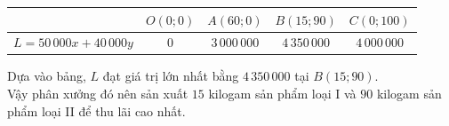 \begin{bt}
{{
}
\begin{center}
	\begin{tabular}{|c|c|c|c|c|}
		\hline
		& $O(0;0)$ & $A(60;0)$ & $B(15;90)$ & $C(0;100)$\\
		\hline
		$L=50\,000x+40\,000y$& $0$ & $3\,000\,000$ & $4\,350\,000$ & $4\,000\,000$\\
		\hline
	\end{tabular}
\end{center}
Dựa vào bảng, $L$ đạt giá trị lớn nhất bằng $4\,350\,000$ tại $B(15;90)$.\\
Vậy phân xưởng đó nên sản xuất $15$ kilogam sản phẩm loại I và $90$ kilogam sản phẩm loại II để thu lãi cao nhất.
}
\end{bt}

